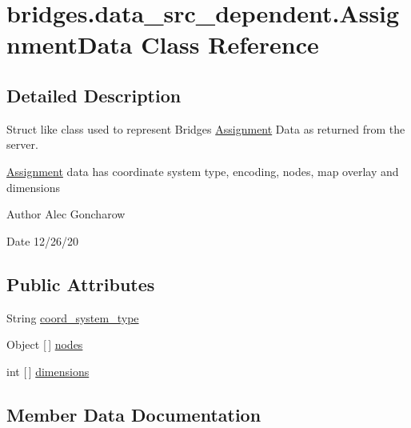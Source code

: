 \hypertarget{classbridges_1_1data__src__dependent_1_1_assignment_data}{}\section{bridges.\+data\+\_\+src\+\_\+dependent.\+Assignment\+Data Class Reference}
\label{classbridges_1_1data__src__dependent_1_1_assignment_data}


\subsection{Detailed Description}
Struct like class used to represent Bridges \hyperlink{classbridges_1_1data__src__dependent_1_1_assignment}{Assignment} Data as returned from the server. 

\hyperlink{classbridges_1_1data__src__dependent_1_1_assignment}{Assignment} data has coordinate system type, encoding, nodes, map overlay and dimensions \begin{DoxyAuthor}{Author}
Alec Goncharow 
\end{DoxyAuthor}
\begin{DoxyDate}{Date}
12/26/20 
\end{DoxyDate}
\subsection*{Public Attributes}
\begin{DoxyCompactItemize}
\item 
String \hyperlink{classbridges_1_1data__src__dependent_1_1_assignment_data_a6734aba0f017aca0024fcd80905be4f4}{coord\+\_\+system\+\_\+type}
\item 
Object \mbox{[}$\,$\mbox{]} \hyperlink{classbridges_1_1data__src__dependent_1_1_assignment_data_a1d7c23816a57cf9b3bd1bc0b53f15e8e}{nodes}
\item 
int \mbox{[}$\,$\mbox{]} \hyperlink{classbridges_1_1data__src__dependent_1_1_assignment_data_ab4aa179a24395748542f6fb64307132c}{dimensions}
\end{DoxyCompactItemize}


\subsection{Member Data Documentation}
\mbox{\label{classbridges_1_1data__src__dependent_1_1_assignment_data_a6734aba0f017aca0024fcd80905be4f4}} 
